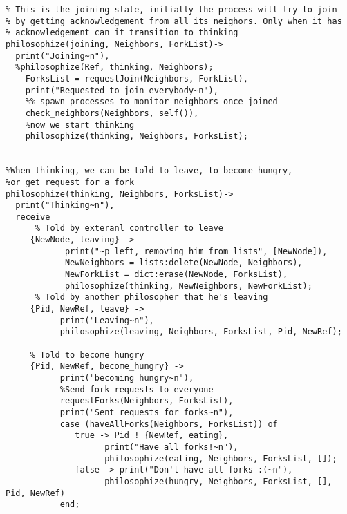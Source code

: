 \documentclass[11pt]{article}
\begin{document}
\begin{lstlisting}
% This is the joining state, initially the process will try to join
% by getting acknowledgement from all its neighors. Only when it has
% acknowledgement can it transition to thinking
philosophize(joining, Neighbors, ForkList)->
  print("Joining~n"),
  %philosophize(Ref, thinking, Neighbors);
    ForksList = requestJoin(Neighbors, ForkList),
    print("Requested to join everybody~n"),
    %% spawn processes to monitor neighbors once joined
    check_neighbors(Neighbors, self()), 
    %now we start thinking
    philosophize(thinking, Neighbors, ForksList);


%When thinking, we can be told to leave, to become hungry,
%or get request for a fork
philosophize(thinking, Neighbors, ForksList)->
  print("Thinking~n"),
  receive
      % Told by exteranl controller to leave
     {NewNode, leaving} -> 
            print("~p left, removing him from lists", [NewNode]),
            NewNeighbors = lists:delete(NewNode, Neighbors),
            NewForkList = dict:erase(NewNode, ForksList),
            philosophize(thinking, NewNeighbors, NewForkList);
      % Told by another philosopher that he's leaving
     {Pid, NewRef, leave} ->
           print("Leaving~n"),
           philosophize(leaving, Neighbors, ForksList, Pid, NewRef);
     
     % Told to become hungry
     {Pid, NewRef, become_hungry} ->
           print("becoming hungry~n"),
           %Send fork requests to everyone
           requestForks(Neighbors, ForksList),
           print("Sent requests for forks~n"),
           case (haveAllForks(Neighbors, ForksList)) of
              true -> Pid ! {NewRef, eating},
                    print("Have all forks!~n"),
                    philosophize(eating, Neighbors, ForksList, []);
              false -> print("Don't have all forks :(~n"),
                    philosophize(hungry, Neighbors, ForksList, [], Pid, NewRef)
           end;
     

\end{lstlisting}
\end{document}
